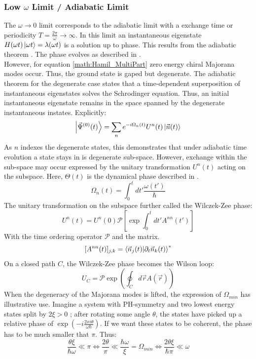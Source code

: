 \documentclass[Master]{subfiles}
\begin{document}
\subsubsection{Low $\omega$ Limit / Adiabatic Limit}\label{anal:Adiabati}
The $\omega \rightarrow 0$ limit corresponds to the adiabatic limit with a exchange time or periodicity $T = \frac{2 \pi}{\omega} \rightarrow \infty$.
In this limit an instantaneous eigenstate $H(\omega t)\ket{\omega t} = \lambda(\omega t)$ is a solution up to phase.
This results from the adiabatic theorem \cite{born1928beweis}. The phase evolves as described in .\\
However, for equation \eqref{math:Hamil_MultiPart}  zero energy chiral Majorana modes occur. Thus, the ground state is gaped but degenerate. The adiabatic theorem for the degenerate case \cite{rigolin2012adiabatic} states that a time-dependent superposition of instantaneous eigenstates solves the Schrodinger equation. Thus, an initial instantaneous eigenstate remains in the space spanned by the degenerate instantaneous instates. Explicitly:
\begin{dmath}\label{eq:DAT}
\ket{\Vec{\Psi}^{(0)}(t)} = \sum_n e^{- i \Omega_n(t)} U^n(t)\ket{\Vec{n}(t)}
\end{dmath}
As $n$ indexes the degenerate states, this demonstrates that under adiabatic time evolution a state stays in is degenerate sub-space. However, exchange within the sub-space may occur expressed by the unitary transformation $U^n(t)$ acting on the subspace.
Here, $\Theta(t)$ is the dynamical phase described in .
$$\Omega_n(t) = \int_0^t dt'\frac{\omega(t')}{\hbar}$$
The unitary transformation on the subspace further called the Wilczek-Zee \cite{wilczek1984appearance} phase:
$$
U^n(t) = U^n(0) \mathcal{P} \left[ \exp\int_0^t dt' A^{nn}(t')\right]
$$With the time ordering operator $\mathcal{P}$ and the matrix. $$
[A^{nn}(t)]_{j,k} = \braket{\Vec{n}_j(t)}{\partial_t \Vec{n}_k(t)}^*
$$
On a closed path $C$, the Wilczek-Zee phase becomes the Wilson loop: \cite{wilczek1984appearance}
$$
U_C = \mathcal{P}\exp(\oint_C d\vec{r} A(\vec{r}) )
$$
When the degeneracy of the Majorana modes is lifted, the expression of $\Omega_{min}$ has illustrative use. Imagine a system with PH-symmetry and two lowest energy states split by $2\xi > 0$ ; after rotating some angle $\theta$, the states have picked up a relative phase of $\exp(-i\frac{2 xi \theta}{\omega\hbar})$.  If we want these states to be coherent, the phase has to be much smaller that $\pi$. Thus:
$$\frac{\theta \xi }{\hbar \omega } \ll \pi \Leftrightarrow \frac{2 \theta}{\pi} \ll \frac{\hbar \omega } {\xi } =\Omega_{min}\Leftrightarrow\frac{ 2 \theta \xi }{\hbar \pi} \ll \omega $$
\end{document}
